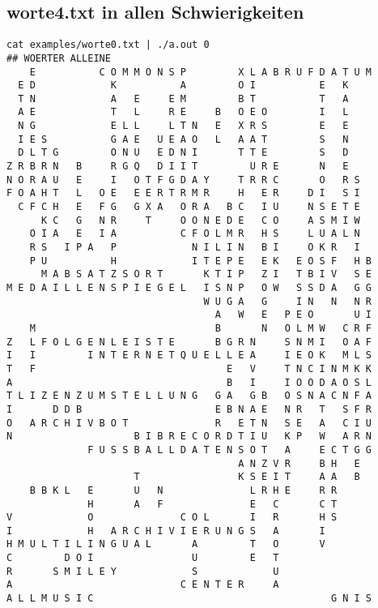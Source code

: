 \documentclass[a4paper,10pt,ngerman]{scrartcl}
\begin{document}
\subsection{worte4.txt in allen Schwierigkeiten}
\begin{lstlisting}
cat examples/worte0.txt | ./a.out 0
## WOERTER ALLEINE
    E           C O M M O N S P         X L A B R U F D A T U M
  E D             K           A         O I           E   K    
  T N             A   E     E M         B T           T   A    
  A E             T   L     R E     B   O E O         I   L    
  N G             E L L     L T N   E   X R S         E   E    
  I E S           G A E   U E A O   L   A A T         S   N    
  D L T G         O N U   E D N I       T T E         S   D    
Z R B R N   B     R G Q   D I I T         U R E       N   E    
N O R A U   E     I   O T F G D A Y     T R R C       O   R S  
F O A H T   L   O E   E E R T R M R     H   E R     D I   S I  
  C F C H   E   F G   G X A   O R A   B C   I U     N S E T E  
      K C   G   N R     T     O O N E D E   C O     A S M I W  
    O I A   E   I A           C F O L M R   H S     L U A L N  
    R S   I P A   P             N I L I N   B I     O K R   I  
    P U           H             I T E P E   E K   E O S F   H B
      M A B S A T Z S O R T       K T I P   Z I   T B I V   S E
M E D A I L L E N S P I E G E L   I S N P   O W   S S D A   G G
                                  W U G A   G     I N   N   N R
                                    A   W   E   P E O       U I
    M                               B       N   O L M W   C R F
Z   L F O L G E N L E I S T E       B G R N     S N M I   O A F
I   I         I N T E R N E T Q U E L L E A     I E O K   M L S
T   F                                 E   V     T N C I N M K K
A                                     B   I     I O O D A O S L
T L I Z E N Z U M S T E L L U N G   G A   G B   O S N A C N F A
I       D D B                       E B N A E   N R   T   S F R
O   A R C H I V B O T               R   E T N   S E   A   C I U
N                     B I B R E C O R D T I U   K P   W   A R N
              F U S S B A L L D A T E N S O T   A     E C T G G
                                        A N Z V R     B H   E  
                      T                 K S E I T     A A   B  
    B B K L   E       U   N               L R H E     R R      
              H       A   F               E   C       C T      
V             O               C O L       I   R       H S      
I             H   A R C H I V I E R U N G S   A       I        
H M U L T I L I N G U A L       A         T   O       V        
C         D O I                 U         E   T                
R       S M I L E Y             S             U                
A                             C E N T E R     A                
A L L M U S I C                                         G N I S


\end{lstlisting}
\end{document}
